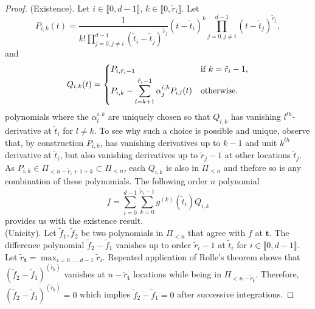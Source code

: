 \begin{proof}
  (Existence). Let $i \in \llbracket0,d-1\rrbracket$, $k \in \llbracket0, \tilde{r}_i\rrbracket$. Let
  \begin{equation*}
    P_{i,k}(t)= \frac{1}{k! \prod_{j=0, j\neq i}^{d-1} {(\tilde{t}_i-\tilde{t}_j)}^{\tilde{r}_j}} {(t-\tilde{t}_i)}^k 
    \prod_{j=0, j\neq i}^{d-1} {(t-\tilde{t}_j)}^{\tilde{r}_j},
  \end{equation*}
  and
  \begin{equation*}
    Q_{i,k}(t)=
    \begin{dcases}
      P_{i,\tilde{r}_i-1} & \text{if} \ k = \tilde{r}_i-1, \\
      P_{i,k} - \sum_{l=k+1}^{\tilde{r}_i-1} \alpha^{i,k}_j P_{i, l}(t) & \text{otherwise}.
    \end{dcases}
  \end{equation*}
  polynomials where the $\alpha^{i,k}_l$ are uniquely chosen so that $Q_{i,k}$ has vanishing $l^{th}$-derivative at 
  $\tilde{t}_i$ for $l \neq k$. To see why such a choice is possible and unique,  observe that, by construction 
  $P_{i,k}$, has vanishing derivatives up to $k-1$ and unit $k^{th}$ derivative at $\tilde{t}_i$, but also vanishing 
  derivatives up to $\tilde{r}_j -1$ at other locations $\tilde{t}_j$. As $P_{i,k} \in \Pi_{<n-{\tilde{r}_i+1+k}} 
  \subset \Pi_{<n}$, each $Q_{i,k}$ is also in $\Pi_{<n}$ and thefore so is any combination of these polynomials. The 
  following order $n$ polynomial
  \begin{equation*}
    f = \sum_{i=0}^{d-1} \sum_{k=0}^{\tilde{r}_i-1} g^{(k)}(\tilde{t}_i) Q_{i,k}
  \end{equation*}
  provides us with the existence result. \\ 

  (Unicity). Let $\tilde{f}_1, \tilde{f}_2$ be two polynomials in $\Pi_{<n}$ that agree with $f$ at $\bm{t}$. The 
  difference polynomial $\tilde{f}_2 - \tilde{f}_1$ vanishes up to order $\tilde{r}_i -1$ at $\tilde{t}_i$ for $i \in 
  \llbracket0,d-1\rrbracket$. Let $\tilde{r}_{\bm{t}} = \max_{i=0, \ldots, d-1} \tilde{r}_i$. Repeated application of 
  Rolle's theorem shows that ${(\tilde{f}_2-\tilde{f}_1)}^{(\tilde{r}_{\bm{t}})}$ vanishes at $n - \tilde{r}_{\bm{t}}$ 
  locations while being in $\Pi_{<n-\tilde{r}_{\bm{t}}}$. Therefore, 
  ${(\tilde{f}_2-\tilde{f}_1)}^{(\tilde{r}_{\bm{t}})}=0$ which implies $\tilde{f}_2-\tilde{f}_1 = 0$ after successive 
  integrations.
\end{proof}

